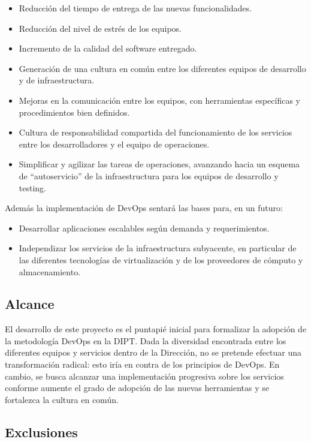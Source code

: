 \begin{itemize}
\item Reducción del tiempo de entrega de las nuevas funcionalidades.
\item Reducción del nivel de estrés de los equipos.
\item Incremento de la calidad del software entregado.
\item Generación de una cultura en común entre los diferentes equipos de desarrollo y de infraestructura.
\item Mejoras en la comunicación entre los equipos, con herramientas específicas y procedimientos bien definidos.
\item Cultura de responsabilidad compartida del funcionamiento de los servicios entre los desarrolladores y el equipo de operaciones.
\item Simplificar y agilizar las tareas de operaciones, avanzando hacia un esquema de “autoservicio” de la infraestructura para los equipos de desarrollo y testing.
\end{itemize}
Además la implementación de DevOps sentará las bases para, en un futuro:

\begin{itemize}
\item Desarrollar aplicaciones escalables según demanda y requerimientos.
\item Independizar los servicios de la infraestructura subyacente, en particular de las diferentes tecnologías de virtualización y de los proveedores de cómputo y almacenamiento.
\end{itemize}
\subsection{Alcance}

El desarrollo de este proyecto es el puntapié inicial para formalizar la adopción de la metodología DevOps en la DIPT. Dada la diversidad encontrada entre los diferentes equipos y servicios dentro de la Dirección, no se pretende efectuar una transformación radical: esto iría en contra de los principios de DevOps. En cambio, se busca alcanzar una implementación progresiva sobre los servicios conforme aumente el grado de adopción de las nuevas herramientas y se fortalezca la cultura en común.

\subsection{Exclusiones}

